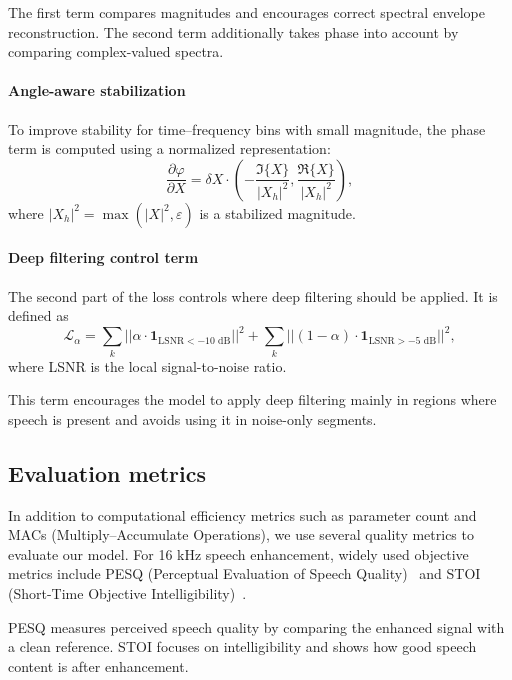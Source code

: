 \documentclass[a4paper,12pt]{extarticle}
\begin{document}
The first term compares magnitudes and encourages correct spectral envelope reconstruction. The second term additionally takes phase into account by comparing complex-valued spectra.

\paragraph{Angle-aware stabilization}

To improve stability for time--frequency bins with small magnitude, the phase term is computed using a normalized representation:
\begin{equation}
\frac{\partial \varphi}{\partial X} = \delta X \cdot ( -\frac{\Im\{X\}}{|X_h|^2}, \frac{\Re\{X\}}{|X_h|^2} ),
\end{equation}
where $|X_h|^2 = \max(|X|^2, \varepsilon)$ is a stabilized magnitude.

\paragraph{Deep filtering control term}

The second part of the loss controls where deep filtering should be applied. It is defined as
\begin{equation}
\mathcal{L}_{\alpha} =
\sum_k || \alpha \cdot \mathbf{1}_{\text{LSNR} < -10\text{ dB}} ||^2
+
\sum_k || (1 - \alpha) \cdot \mathbf{1}_{\text{LSNR} > -5\text{ dB}} ||^2,
\end{equation}
where LSNR is the local signal-to-noise ratio.

This term encourages the model to apply deep filtering mainly in regions where speech is present and avoids using it in noise-only segments.

\subsection{Evaluation metrics}

In addition to computational efficiency metrics such as parameter count and MACs (Multiply–Accumulate Operations), we use several quality
metrics to evaluate our model. For 16 kHz speech enhancement, widely used objective metrics include PESQ
(Perceptual Evaluation of Speech Quality)~\cite{pesq} and STOI (Short-Time Objective Intelligibility)~\cite{stoi}.

PESQ measures perceived speech quality by comparing the enhanced signal with a clean reference. STOI
focuses on intelligibility and shows how good speech content is after enhancement.
\end{document}
